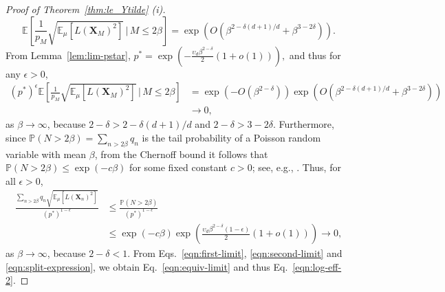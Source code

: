 \documentclass[pdflatex, sn-mathphys-ay]{sn-jnl}%
\renewcommand{\v}[1]{\boldsymbol{#1}}
\newcommand{\pp}{\mathbb{P}}
\newcommand{\ee}{\mathbb{E}}
\newcommand{\mX}{\v{X}}
\newcommand{\lt}{\left}
\newcommand{\rt}{\right}
\theoremstyle{thmstyleone}%
\theoremstyle{thmstyletwo}%
\theoremstyle{thmstylethree}%
\begin{document}
\begin{proof}[Proof of Theorem~\ref{thm:le_Ytilde} (i)]
\[
\ee\lt[\frac{1}{p_M}\sqrt{\ee_\mu[L(\mX_M)^2]} \, \bigg|\, M \leq  2\beta\rt] = \exp\lt( O\lt(\beta^{2 - {\delta(d+1)/d}} + \beta^{3 - 2\delta} \rt)\rt).
\]
From Lemma~\ref{lem:lim-pstar}, $
p^* = \exp\lt(-\frac{\upsilon_d \beta^{2 - \delta}}{2} (1 + o(1)) \rt),
$
and thus for any $\epsilon > 0$,
\begin{align}
    (p^*)^{\epsilon} \ee\lt[\frac{1}{p_M}\sqrt{\ee_\mu[L(\mX_M)^2]} \, \bigg|\, M \leq  2\beta\rt] &= \exp( -O(\beta^{2 - \delta})) \exp\lt( O\lt(\beta^{2 - {\delta(d+1)/d}} + \beta^{3 - 2\delta} \rt)\rt)\nonumber\\
    &\longrightarrow 0, \label{eqn:first-limit}
\end{align}
as $\beta \to \infty$, 
because $2 - \delta > 2- {\delta(d+1)/d}$ and $2 - \delta > 3 - 2\delta$. 
Furthermore, since $\pp(N > 2\beta) = \sum_{n > 2\beta} q_n$ is the tail probability of a Poisson random variable with mean $\beta$, from the Chernoff bound it follows that $\pp(N > 2\beta) \leq \exp(-c\beta)$ for some fixed constant $c > 0$; see, e.g., \cite{short2013improved}. Thus, for all $\epsilon>0$,
\begin{align}
\frac{\sum_{n >  2\beta} q_n \sqrt{\ee_\mu[L(\mX_n)^2]}}{(p^*)^{1- \epsilon}} &\leq \frac{\pp(N > 2\beta)}{(p^*)^{1- \epsilon}}\nonumber\\
&\leq  \exp(- c \beta) \exp\lt(\frac{\upsilon_d \beta^{2 - \delta}(1 - \epsilon)}{2} (1 + o(1)) \rt) 
\longrightarrow 0, 
\label{eqn:second-limit}
\end{align}
as $\beta \to \infty$, because $2 - \delta < 1$. From Eqs.~\eqref{eqn:first-limit}, \eqref{eqn:second-limit} and \eqref{eqn:split-expression}, we obtain Eq.~\eqref{eqn:equiv-limit} and thus Eq.~\eqref{eqn:log-eff-2}.
\end{proof}
\end{document}
